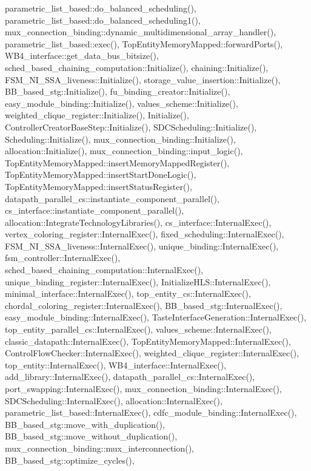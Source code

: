 parametric\+\_\+list\+\_\+based\+::do\+\_\+balanced\+\_\+scheduling(), parametric\+\_\+list\+\_\+based\+::do\+\_\+balanced\+\_\+scheduling1(), mux\+\_\+connection\+\_\+binding\+::dynamic\+\_\+multidimensional\+\_\+array\+\_\+handler(), parametric\+\_\+list\+\_\+based\+::exec(), Top\+Entity\+Memory\+Mapped\+::forward\+Ports(), W\+B4\+\_\+interface\+::get\+\_\+data\+\_\+bus\+\_\+bitsize(), sched\+\_\+based\+\_\+chaining\+\_\+computation\+::\+Initialize(), chaining\+::\+Initialize(), F\+S\+M\+\_\+\+N\+I\+\_\+\+S\+S\+A\+\_\+liveness\+::\+Initialize(), storage\+\_\+value\+\_\+insertion\+::\+Initialize(), B\+B\+\_\+based\+\_\+stg\+::\+Initialize(), fu\+\_\+binding\+\_\+creator\+::\+Initialize(), easy\+\_\+module\+\_\+binding\+::\+Initialize(), values\+\_\+scheme\+::\+Initialize(), weighted\+\_\+clique\+\_\+register\+::\+Initialize(), Initialize(), Controller\+Creator\+Base\+Step\+::\+Initialize(), S\+D\+C\+Scheduling\+::\+Initialize(), Scheduling\+::\+Initialize(), mux\+\_\+connection\+\_\+binding\+::\+Initialize(), allocation\+::\+Initialize(), mux\+\_\+connection\+\_\+binding\+::input\+\_\+logic(), Top\+Entity\+Memory\+Mapped\+::insert\+Memory\+Mapped\+Register(), Top\+Entity\+Memory\+Mapped\+::insert\+Start\+Done\+Logic(), Top\+Entity\+Memory\+Mapped\+::insert\+Status\+Register(), datapath\+\_\+parallel\+\_\+cs\+::instantiate\+\_\+component\+\_\+parallel(), cs\+\_\+interface\+::instantiate\+\_\+component\+\_\+parallel(), allocation\+::\+Integrate\+Technology\+Libraries(), cs\+\_\+interface\+::\+Internal\+Exec(), vertex\+\_\+coloring\+\_\+register\+::\+Internal\+Exec(), fixed\+\_\+scheduling\+::\+Internal\+Exec(), F\+S\+M\+\_\+\+N\+I\+\_\+\+S\+S\+A\+\_\+liveness\+::\+Internal\+Exec(), unique\+\_\+binding\+::\+Internal\+Exec(), fsm\+\_\+controller\+::\+Internal\+Exec(), sched\+\_\+based\+\_\+chaining\+\_\+computation\+::\+Internal\+Exec(), unique\+\_\+binding\+\_\+register\+::\+Internal\+Exec(), Initialize\+H\+L\+S\+::\+Internal\+Exec(), minimal\+\_\+interface\+::\+Internal\+Exec(), top\+\_\+entity\+\_\+cs\+::\+Internal\+Exec(), chordal\+\_\+coloring\+\_\+register\+::\+Internal\+Exec(), B\+B\+\_\+based\+\_\+stg\+::\+Internal\+Exec(), easy\+\_\+module\+\_\+binding\+::\+Internal\+Exec(), Taste\+Interface\+Generation\+::\+Internal\+Exec(), top\+\_\+entity\+\_\+parallel\+\_\+cs\+::\+Internal\+Exec(), values\+\_\+scheme\+::\+Internal\+Exec(), classic\+\_\+datapath\+::\+Internal\+Exec(), Top\+Entity\+Memory\+Mapped\+::\+Internal\+Exec(), Control\+Flow\+Checker\+::\+Internal\+Exec(), weighted\+\_\+clique\+\_\+register\+::\+Internal\+Exec(), top\+\_\+entity\+::\+Internal\+Exec(), W\+B4\+\_\+interface\+::\+Internal\+Exec(), add\+\_\+library\+::\+Internal\+Exec(), datapath\+\_\+parallel\+\_\+cs\+::\+Internal\+Exec(), port\+\_\+swapping\+::\+Internal\+Exec(), mux\+\_\+connection\+\_\+binding\+::\+Internal\+Exec(), S\+D\+C\+Scheduling\+::\+Internal\+Exec(), allocation\+::\+Internal\+Exec(), parametric\+\_\+list\+\_\+based\+::\+Internal\+Exec(), cdfc\+\_\+module\+\_\+binding\+::\+Internal\+Exec(), B\+B\+\_\+based\+\_\+stg\+::move\+\_\+with\+\_\+duplication(), B\+B\+\_\+based\+\_\+stg\+::move\+\_\+without\+\_\+duplication(), mux\+\_\+connection\+\_\+binding\+::mux\+\_\+interconnection(), B\+B\+\_\+based\+\_\+stg\+::optimize\+\_\+cycles(), 